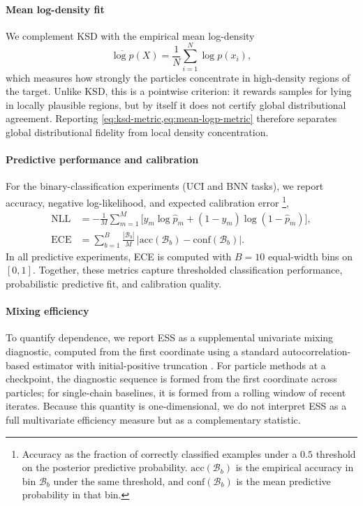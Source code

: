 \paragraph{Mean log-density fit}
We complement KSD with the empirical mean log-density
\begin{equation}
\overline{\log p}(X)=\frac{1}{N}\sum_{i=1}^{N}\log p(x_i),
\label{eq:mean-logp-metric}
\end{equation}
which measures how strongly the particles concentrate in high-density regions
of the target. Unlike KSD, this is a pointwise criterion: it rewards samples
for lying in locally plausible regions, but by itself it does not certify
global distributional agreement. Reporting
\cref{eq:ksd-metric,eq:mean-logp-metric} therefore separates global
distributional fidelity from local density concentration.

\paragraph{Predictive performance and calibration}
For the binary-classification experiments (UCI and BNN tasks), we report
accuracy, negative log-likelihood, and
expected calibration error \footnote{Accuracy as the fraction of correctly classified examples
under a $0.5$ threshold on the posterior predictive probability.  $\mathrm{acc}(\mathcal{B}_b)$  is the empirical accuracy in bin $\mathcal{B}_b$ under the same threshold, and $\mathrm{conf}(\mathcal{B}_b)$ is
the mean predictive probability in that bin.},
\begin{align}
\mathrm{NLL}
&= -\frac{1}{M}\sum_{m=1}^M
\big[y_m\log \hat p_m+(1-y_m)\log(1-\hat p_m)\big], \\
\mathrm{ECE}
&= \sum_{b=1}^{B}\frac{|\mathcal{B}_b|}{M}\,
\big|\mathrm{acc}(\mathcal{B}_b)-\mathrm{conf}(\mathcal{B}_b)\big|.
\end{align}
In all predictive experiments, ECE is computed with $B=10$ equal-width bins on
$[0,1]$. Together, these metrics capture thresholded classification
performance, probabilistic predictive fit, and calibration quality.

\paragraph{Mixing efficiency}
To quantify dependence, we report ESS as a supplemental univariate mixing
diagnostic, computed from the first coordinate using a standard
autocorrelation-based estimator with initial-positive truncation
\cite{geyer1992practical}. For particle methods at a checkpoint, the diagnostic
sequence is formed from the first coordinate across particles; for single-chain
baselines, it is formed from a rolling window of recent iterates. Because this
quantity is one-dimensional, we do not interpret ESS as a full multivariate
efficiency measure but as a complementary statistic.

